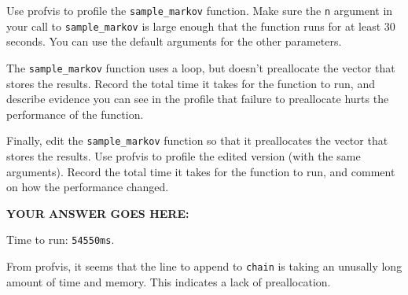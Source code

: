 \documentclass[
]{article}
\begin{document}
Use profvis to profile the \texttt{sample\_markov} function. Make sure
the \texttt{n} argument in your call to \texttt{sample\_markov} is large
enough that the function runs for at least 30 seconds. You can use the
default arguments for the other parameters.

The \texttt{sample\_markov} function uses a loop, but doesn't
preallocate the vector that stores the results. Record the total time it
takes for the function to run, and describe evidence you can see in the
profile that failure to preallocate hurts the performance of the
function.

Finally, edit the \texttt{sample\_markov} function so that it
preallocates the vector that stores the results. Use profvis to profile
the edited version (with the same arguments). Record the total time it
takes for the function to run, and comment on how the performance
changed.

\textbf{YOUR ANSWER GOES HERE:}

Time to run: \texttt{54550ms}.

From profvis, it seems that the line to append to \texttt{chain} is
taking an unusally long amount of time and memory. This indicates a lack
of preallocation.
\end{document}

